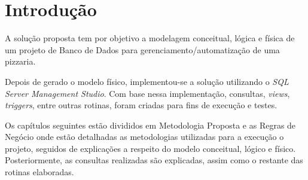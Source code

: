 \documentclass[
	12pt,				%
	openright,			%
	oneside,			%
	a4paper,			%
	chapter=TITLE,		%
	section=TITLE,		%
	english,			%
	brazil				%
	]{abntex2}
\begin{document}
\listoftables*
\cleardoublepage



\tableofcontents*
\cleardoublepage

\textual

\chapter*[Introdução]{Introdução}
    A solução proposta tem por objetivo a modelagem conceitual, lógica e física de um projeto de Banco de Dados
    para gerenciamento/automatização de uma pizzaria. 

    Depois de gerado o modelo físico, implementou-se a solução utilizando o \textit{SQL Server Management Studio}. 
    Com base nessa implementação, consultas, \textit{views}, \textit{triggers}, entre outras rotinas, foram criadas para 
    fins de execução e testes.
    
    Os capítulos seguintes estão divididos em Metodologia Proposta e as Regras de Negócio onde estão detalhadas as metodologias utilizadas para a 
    execução o projeto, seguidos de explicações a respeito do modelo conceitual, lógico e físico. Posteriormente, 
    as consultas realizadas são explicadas, assim como o restante das rotinas elaboradas.
\end{document}

